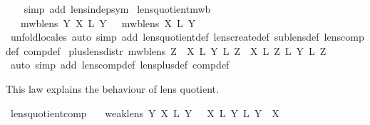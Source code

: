 \begin{isabellebody}
\ \ \isamarkupfalse%
\ {\isacharparenleft}simp\ add{\isacharcolon}\ lens{\isacharunderscore}indep{\isacharunderscore}sym{\isacharparenright}\isanewline
{}\isamarkupfalse%
%
\endisatagproof
{\isafoldproof}%
%
\isadelimproof
\isanewline
%
\endisadelimproof
\isanewline
{}\isamarkupfalse%
\ lens{\isacharunderscore}quotient{\isacharunderscore}mwb{\isacharcolon}\isanewline
\ \ {\isachardoublequoteopen}{\isasymlbrakk}\ mwb{\isacharunderscore}lens\ Y{\isacharsemicolon}\ X\ {\isasymsubseteq}\isactrlsub L\ Y\ {\isasymrbrakk}\ {\isasymLongrightarrow}\ mwb{\isacharunderscore}lens\ {\isacharparenleft}X\ {\isacharslash}\isactrlsub L\ Y{\isacharparenright}{\isachardoublequoteclose}\isanewline
%
\isadelimproof
\ \ %
\endisadelimproof
%
\isatagproof
{}\isamarkupfalse%
\ {\isacharparenleft}unfold{\isacharunderscore}locales{\isacharcomma}\ auto\ simp\ add{\isacharcolon}\ lens{\isacharunderscore}quotient{\isacharunderscore}def\ lens{\isacharunderscore}create{\isacharunderscore}def\ sublens{\isacharunderscore}def\ lens{\isacharunderscore}comp{\isacharunderscore}def\ comp{\isacharunderscore}def{\isacharparenright}%
\endisatagproof
{\isafoldproof}%
%
\isadelimproof
%
\endisadelimproof
%
\isamarkuptrue%
\isamarkupfalse%
\ plus{\isacharunderscore}lens{\isacharunderscore}distr{\isacharcolon}\ {\isachardoublequoteopen}mwb{\isacharunderscore}lens\ Z\ {\isasymLongrightarrow}\ {\isacharparenleft}X\ {\isacharplus}\isactrlsub L\ Y{\isacharparenright}\ {\isacharsemicolon}\isactrlsub L\ Z\ {\isacharequal}\ {\isacharparenleft}X\ {\isacharsemicolon}\isactrlsub L\ Z{\isacharparenright}\ {\isacharplus}\isactrlsub L\ {\isacharparenleft}Y\ {\isacharsemicolon}\isactrlsub L\ Z{\isacharparenright}{\isachardoublequoteclose}\isanewline
%
\isadelimproof
\ \ %
\endisadelimproof
%
\isatagproof
{}\isamarkupfalse%
\ {\isacharparenleft}auto\ simp\ add{\isacharcolon}\ lens{\isacharunderscore}comp{\isacharunderscore}def\ lens{\isacharunderscore}plus{\isacharunderscore}def\ comp{\isacharunderscore}def{\isacharparenright}%
\endisatagproof
{\isafoldproof}%
%
\isadelimproof
%
\endisadelimproof
%
\begin{isamarkuptext}%
This law explains the behaviour of lens quotient.%
\end{isamarkuptext}\isamarkuptrue%
\isamarkupfalse%
\ lens{\isacharunderscore}quotient{\isacharunderscore}comp{\isacharcolon}\isanewline
\ \ {\isachardoublequoteopen}{\isasymlbrakk}\ weak{\isacharunderscore}lens\ Y{\isacharsemicolon}\ X\ {\isasymsubseteq}\isactrlsub L\ Y\ {\isasymrbrakk}\ {\isasymLongrightarrow}\ {\isacharparenleft}X\ {\isacharslash}\isactrlsub L\ Y{\isacharparenright}\ {\isacharsemicolon}\isactrlsub L\ Y\ {\isacharequal}\ X{\isachardoublequoteclose}\isanewline

\end{isabellebody}
